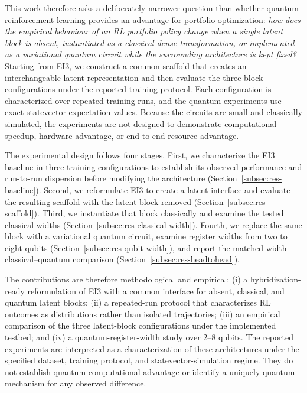 \documentclass[aps,floatfix,superscriptaddress,twocolumn,tightenlines,amsmath,amssymb,nofootinbib,10pt,longbibliography,prl]{revtex4-2}
\begin{document}
This work therefore asks a deliberately narrower question than whether quantum reinforcement learning provides an advantage for portfolio optimization: \emph{how does the empirical behaviour of an RL portfolio policy change when a single latent block is absent, instantiated as a classical dense transformation, or implemented as a variational quantum circuit while the surrounding architecture is kept fixed?} Starting from EI3, we construct a common scaffold that creates an interchangeable latent representation and then evaluate the three block configurations under the reported training protocol. Each configuration is characterized over repeated training runs, and the quantum experiments use exact statevector expectation values. Because the circuits are small and classically simulated, the experiments are not designed to demonstrate computational speedup, hardware advantage, or end-to-end resource advantage.

The experimental design follows four stages. First, we characterize the EI3 baseline in three training configurations to establish its observed performance and run-to-run dispersion before modifying the architecture (Section~\ref{subsec:res-baseline}). Second, we reformulate EI3 to create a latent interface and evaluate the resulting scaffold with the latent block removed (Section~\ref{subsec:res-scaffold}). Third, we instantiate that block classically and examine the tested classical widths (Section~\ref{subsec:res-classical-width}). Fourth, we replace the same block with a variational quantum circuit, examine register widths from two to eight qubits (Section~\ref{subsec:res-qubit-width}), and report the matched-width classical--quantum comparison (Section~\ref{subsec:res-headtohead}).

The contributions are therefore methodological and empirical: (i) a hybridization-ready reformulation of EI3 with a common interface for absent, classical, and quantum latent blocks; (ii) a repeated-run protocol that characterizes RL outcomes as distributions rather than isolated trajectories; (iii) an empirical comparison of the three latent-block configurations under the implemented testbed; and (iv) a quantum-register-width study over \num{2}--\num{8} qubits. The reported experiments are interpreted as a characterization of these architectures under the specified dataset, training protocol, and statevector-simulation regime. They do not establish quantum computational advantage or identify a uniquely quantum mechanism for any observed difference.
\end{document}
